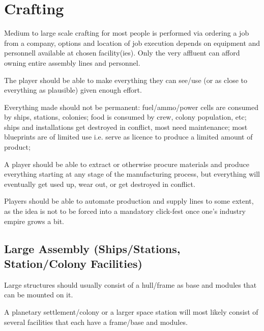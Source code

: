 \documentclass[a4paper,10pt]{article}
\begin{document}
\section{Crafting}
\begin{multicols}{2}
Medium to large scale crafting for most people is performed via ordering a
job from a company, options and location of job execution depends on equipment
and personnell available at chosen facility(ies). Only the very affluent can
afford owning entire assembly lines and personnel.

The player should be able to make everything they can see/use (or as close to
everything as plausible) given enough effort.

Everything made should not be permanent: fuel/ammo/power cells are consumed by
ships, stations, colonies; food is consumed by crew, colony population, etc;
ships and installations get destroyed in conflict, most need maintenance; most
blueprints are of limited use i.e. serve as licence to produce a limited amount
of product;

A player should be able to extract or otherwise procure materials and produce
everything starting at any stage of the manufacturing process, but everything
will eventually get used up, wear out, or get destroyed in conflict.

Players should be able to automate production and supply lines to some extent,
as the idea is not to be forced into a mandatory click-fest once one's industry
empire grows a bit.

\subsection{Large Assembly (Ships/Stations, Station/Colony Facilities)}
Large structures should usually consist of a hull/frame as base and modules
that can be mounted on it.

A planetary settlement/colony or a larger space station will most likely consist
of several facilities that each have a frame/base and modules.
\end{multicols}
\end{document}

